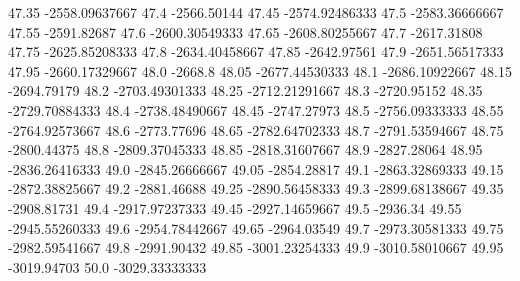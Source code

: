           47.35   -2558.09637667
           47.4      -2566.50144
          47.45   -2574.92486333
           47.5   -2583.36666667
          47.55      -2591.82687
           47.6   -2600.30549333
          47.65   -2608.80255667
           47.7      -2617.31808
          47.75   -2625.85208333
           47.8   -2634.40458667
          47.85      -2642.97561
           47.9   -2651.56517333
          47.95   -2660.17329667
           48.0          -2668.8
          48.05   -2677.44530333
           48.1   -2686.10922667
          48.15      -2694.79179
           48.2   -2703.49301333
          48.25   -2712.21291667
           48.3      -2720.95152
          48.35   -2729.70884333
           48.4   -2738.48490667
          48.45      -2747.27973
           48.5   -2756.09333333
          48.55   -2764.92573667
           48.6      -2773.77696
          48.65   -2782.64702333
           48.7   -2791.53594667
          48.75      -2800.44375
           48.8   -2809.37045333
          48.85   -2818.31607667
           48.9      -2827.28064
          48.95   -2836.26416333
           49.0   -2845.26666667
          49.05      -2854.28817
           49.1   -2863.32869333
          49.15   -2872.38825667
           49.2      -2881.46688
          49.25   -2890.56458333
           49.3   -2899.68138667
          49.35      -2908.81731
           49.4   -2917.97237333
          49.45   -2927.14659667
           49.5         -2936.34
          49.55   -2945.55260333
           49.6   -2954.78442667
          49.65      -2964.03549
           49.7   -2973.30581333
          49.75   -2982.59541667
           49.8      -2991.90432
          49.85   -3001.23254333
           49.9   -3010.58010667
          49.95      -3019.94703
           50.0   -3029.33333333
